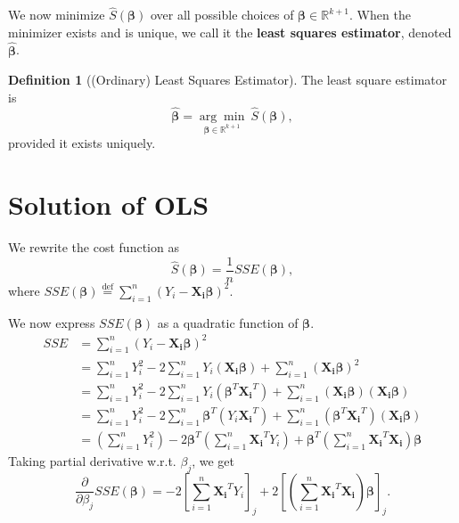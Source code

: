 \documentclass[
]{book}
\theoremstyle{definition}
\newtheorem{definition}{Definition}[chapter]
\theoremstyle{definition}
\theoremstyle{definition}
\theoremstyle{definition}
\theoremstyle{remark}
\begin{document}
We now minimize \(\widehat{S}({{\boldsymbol{\beta}}})\) over all possible choices of
\({\boldsymbol{\beta}}\in\mathbb{R}^{k+1}\). When the minimizer exists and is unique, we call it the \textbf{least squares estimator}, denoted \(\widehat{{\boldsymbol{\beta}}}\).

\begin{definition}[(Ordinary) Least Squares Estimator]
The least square estimator is \[
\widehat{{\boldsymbol{\beta}}}
=\underset{{\boldsymbol{\beta}}\in\mathbb{R}^{k+1}}{\arg\min} \ \widehat{S}({\boldsymbol{\beta}}),
\]
provided it exists uniquely.
\end{definition}

\hypertarget{solution-of-ols}{%
\section{Solution of OLS}\label{solution-of-ols}}

We rewrite the cost function as
\[
\widehat{S}({\boldsymbol{\beta}})=\frac{1}{n}SSE({\boldsymbol{\beta}}),
\]
where
\(SSE({\boldsymbol{\beta}})\stackrel{\text{def}}{=}\sum\limits_{i=1}^n(Y_i-{\boldsymbol{X_i}}{\boldsymbol{\beta}})^2\).

We now express \(SSE({\boldsymbol{\beta}})\) as a quadratic function of \({\boldsymbol{\beta}}\).
\[
\begin{aligned}
SSE &=\sum\limits_{i=1}^n(Y_i-{\boldsymbol{X_i}}{\boldsymbol{\beta}})^2 \\
&=\sum\limits_{i=1}^n Y_i^2 
  - 2\sum\limits_{i=1}^n Y_i({\boldsymbol{X_i}}{\boldsymbol{\beta}})
  + \sum\limits_{i=1}^n ({\boldsymbol{X_i}}{\boldsymbol{\beta}})^2 \\
&=\sum\limits_{i=1}^n Y_i^2 
  - 2\sum\limits_{i=1}^n Y_i({\boldsymbol{\beta}}^T{\boldsymbol{X_i}}^T)
  + \sum\limits_{i=1}^n ({\boldsymbol{X_i}}{\boldsymbol{\beta}})({\boldsymbol{X_i}}{\boldsymbol{\beta}}) \\
&=\sum\limits_{i=1}^n Y_i^2 
  - 2\sum\limits_{i=1}^n {\boldsymbol{\beta}}^T(Y_i{\boldsymbol{X_i}}^T)
  + \sum\limits_{i=1}^n ({\boldsymbol{\beta}}^T{\boldsymbol{X_i}}^T)({\boldsymbol{X_i}}{\boldsymbol{\beta}}) \\
&=\left(\sum\limits_{i=1}^n Y_i^2\right) 
  - 2{\boldsymbol{\beta}}^T\left(\sum\limits_{i=1}^n{\boldsymbol{X_i}}^TY_i\right)
  + {\boldsymbol{\beta}}^T\left(\sum\limits_{i=1}^n {\boldsymbol{X_i}}^T{\boldsymbol{X_i}}\right){\boldsymbol{\beta}}
\end{aligned}
\]
Taking partial derivative w.r.t. \(\beta_j\), we get
\[
\frac{\partial}{\partial\beta_j}SSE({\boldsymbol{\beta}})=-2\left[\sum\limits_{i=1}^n{\boldsymbol{X_i}}^TY_i\right]_j 
+ 2\left[\left(\sum\limits_{i=1}^n  {\boldsymbol{X_i}}^T{\boldsymbol{X_i}}\right){\boldsymbol{\beta}}\right]_j.
\]
\end{document}
